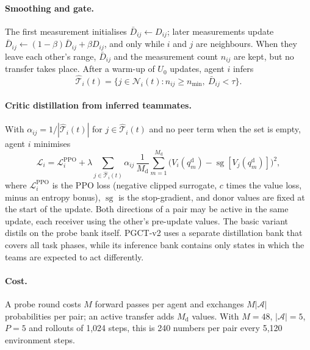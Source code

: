 \documentclass{article}
\theoremstyle{remark}
\newcommand{\sg}{\operatorname{sg}}
\newcommand{\ours}{PGCT}
\begin{document}
\paragraph{Smoothing and gate.} The first measurement initialises $\bar D_{ij}\gets D_{ij}$; later measurements update
$\bar D_{ij}\gets(1-\beta)\bar D_{ij}+\beta D_{ij}$, and only while $i$ and $j$ are neighbours. When they leave each other's
range, $\bar D_{ij}$ and the measurement count $n_{ij}$ are kept, but no transfer takes place. After a warm-up of $U_0$
updates, agent $i$ infers
\begin{equation}
  \hat{\mathcal{T}}_i(t)=\{j\in\mathcal{N}_i(t): n_{ij}\ge n_{\min},\ \bar D_{ij}<\tau\}.
\end{equation}

\paragraph{Critic distillation from inferred teammates.} With $\alpha_{ij}=1/|\hat{\mathcal{T}}_i(t)|$ for
$j\in\hat{\mathcal{T}}_i(t)$ and no peer term when the set is empty, agent $i$ minimises
\begin{equation}
  \mathcal{L}_i=\mathcal{L}^{\mathrm{PPO}}_i+\lambda\sum_{j\in\hat{\mathcal{T}}_i(t)}\alpha_{ij}\,
  \frac{1}{M_{\mathrm{d}}}\sum_{m=1}^{M_{\mathrm{d}}}\big(V_i(q^{\mathrm{d}}_m)-\sg[V_j(q^{\mathrm{d}}_m)]\big)^2,
  \label{eq:loss}
\end{equation}
where $\mathcal{L}^{\mathrm{PPO}}_i$ is the PPO loss (negative clipped surrogate, $c$ times the value loss, minus an
entropy bonus), $\sg$ is the stop-gradient, and donor values are fixed at the start of the update. Both directions of a pair
may be active in the same update, each receiver using the other's pre-update values. The basic variant distils on the probe
bank itself. \ours{}-v2 uses a separate distillation bank that covers all task phases, while its inference bank contains only
states in which the teams are expected to act differently.

\paragraph{Cost.} A probe round costs $M$ forward passes per agent and exchanges $M|\mathcal{A}|$ probabilities per pair; an
active transfer adds $M_{\mathrm{d}}$ values. With $M=48$, $|\mathcal{A}|=5$, $P=5$ and rollouts of 1{,}024 steps, this is
240 numbers per pair every 5{,}120 environment steps.
\end{document}
